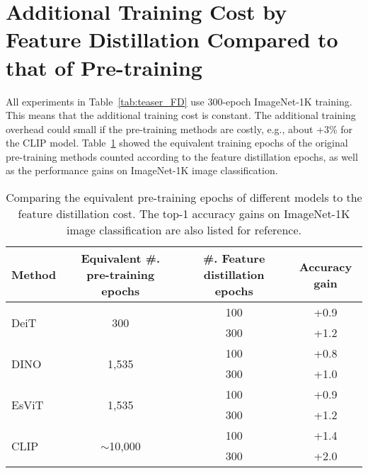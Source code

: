 \documentclass{article}
\begin{document}
\newpage
\section{Additional Training Cost by Feature Distillation Compared to that of Pre-training}

All experiments in Table~\ref{tab:teaser_FD} use 300-epoch ImageNet-1K training. This means that the additional training cost is constant. The additional training overhead could small if the pre-training methods are costly, e.g., about +3\% for the CLIP model. Table~\ref{tab:Efficiency} showed the equivalent training epochs of the original pre-training methods counted according to the feature distillation epochs, as well as the performance gains on ImageNet-1K image classification.

\begin{table}[h]
\caption{Comparing the equivalent pre-training epochs of different models to the feature distillation cost. The top-1 accuracy gains on ImageNet-1K image classification are also listed for reference.}
\centering
  \begin{tabular}{l|c|c|c}
  \toprule
  Method & Equivalent \#. pre-training epochs & \#. Feature distillation epochs & Accuracy gain \\
  \hline
  \multirow{2}{*}{DeiT} & \multirow{2}{*}{300} & 100 & +0.9 \\
   &  & 300 & +1.2 \\
   \hline
  \multirow{2}{*}{DINO} & \multirow{2}{*}{1,535} & 100 & +0.8 \\
    &   & 300 & +1.0 \\
   \hline
  \multirow{2}{*}{EsViT} & \multirow{2}{*}{1,535} & 100 & +0.9 \\
    &   & 300 & +1.2 \\
   \hline
  \multirow{2}{*}{CLIP} & \multirow{2}{*}{$\sim$10,000} & 100 & +1.4 \\
    &   & 300 & +2.0 \\
  \bottomrule
  \end{tabular}
\label{tab:Efficiency}
\end{table}
\end{document}
